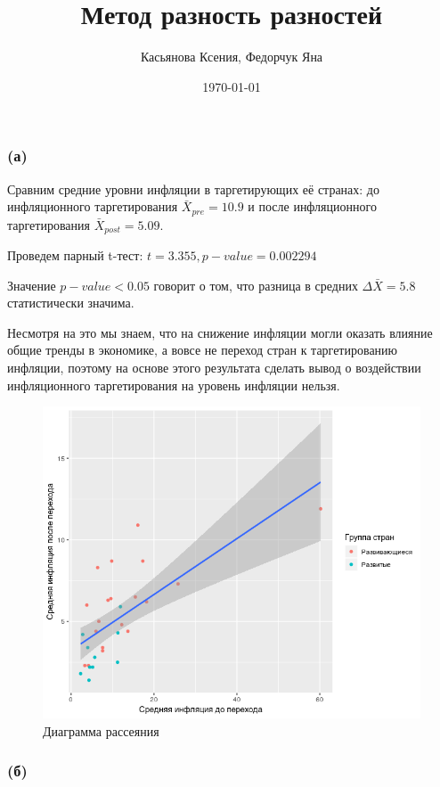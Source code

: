 \documentclass[a4paper,12pt]{article} %
\author{Касьянова Ксения, Федорчук Яна  }
\title{Метод разность разностей}
\date{\today}
\begin{document}
\maketitle

\subsubsection*{(а)}	

Сравним средние уровни инфляции в таргетирующих её странах:  до инфляционного таргетирования $ \bar{X}_{pre} = 10.9 $ и после инфляционного таргетирования $ \bar{X}_{post} = 5.09$. 

Проведем парный t-тест: $ t = 3.355, p-value = 0.002294$

Значение $ p-value < 0.05 $ говорит о том, что разница в средних $ \Delta \bar{X} = 5.8 $  статистически значима.    

Несмотря на это мы знаем, что на снижение инфляции могли оказать влияние  общие тренды в экономике, а вовсе не переход стран к таргетированию инфляции, поэтому  на основе
этого результата сделать вывод о воздействии инфляционного
таргетирования на уровень инфляции нельзя.

	
\begin{figure}[h!]
	\centering
	\includegraphics[width=0.7\linewidth]{Rplot}
	\caption[Диаграмма рассеяния]{Диаграмма рассеяния}
	\label{fig:rplot1}
\end{figure}



\newpage


	
	
\subsubsection*{(б)}	
\end{document}
